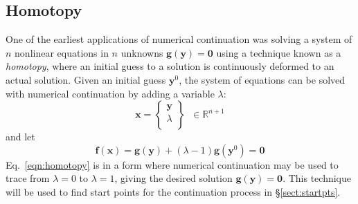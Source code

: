 \documentclass[11pt,openany,twoside]{book}
\numberwithin{equation}{section}		%
\newcommand{\Newterm}[1]{{\em #1}}	%
\newcommand{\Vector}[1]{\boldsymbol{#1}}
\newcommand{\Sectref}[1]{\S\ref{#1}}
\newcommand{\Eqn}[1]{Eq.\ \ref{#1}}  %
\begin{document}
\subsection{Homotopy}\label{sect:homotopy}
One of the earliest applications of numerical continuation was solving a system
of $n$ nonlinear equations in $n$ unknowns
$\Vector{g}(\Vector{y})=\Vector{0}$ using a
technique known as a \Newterm{homotopy},
where an initial guess to a solution is continuously deformed to an actual solution.
Given an initial guess $\Vector{y}^0$,
the system of equations can be solved with numerical continuation by adding
a variable $\lambda$:
\begin{equation}
\Vector{x} = \left\{\begin{array}{c}
\Vector{y} \\
\lambda \\
\end{array} \right\} \;\; \in \mathbb{R}^{n+1}
\end{equation}
and let
\begin{equation}\label{eqn:homotopy}
\Vector{f}(\Vector{x}) = \Vector{g}(\Vector{y})
	+ (\lambda - 1)\Vector{g}(\Vector{y}^0) = \Vector{0}
\end{equation}
\Eqn{eqn:homotopy} is in a form where numerical continuation may be used to
trace from $\lambda=0$ to $\lambda=1$, giving the desired solution
$\Vector{g}(\Vector{y}) = \Vector{0}$.
This technique will be used to find start points for the continuation process
in \Sectref{sect:startpts}.
\end{document}
